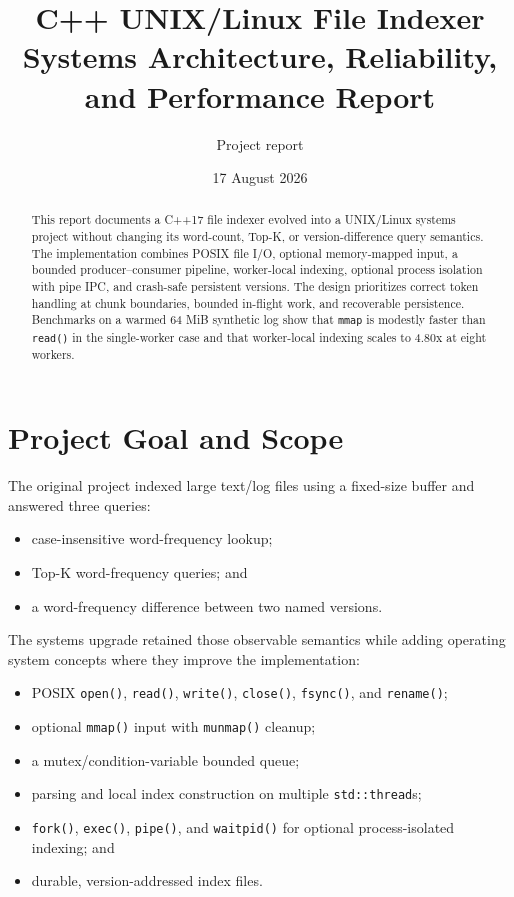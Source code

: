 \documentclass[11pt]{article}
\title{\textbf{C++ UNIX/Linux File Indexer}\\
\large Systems Architecture, Reliability, and Performance Report}
\author{Project report}
\date{17 August 2026}
\begin{document}
\flushbottom
\maketitle

\begin{abstract}
This report documents a C++17 file indexer evolved into a UNIX/Linux systems
project without changing its word-count, Top-K, or version-difference query
semantics. The implementation combines POSIX file I/O, optional memory-mapped
input, a bounded producer--consumer pipeline, worker-local indexing, optional
process isolation with pipe IPC, and crash-safe persistent versions. The design
prioritizes correct token handling at chunk boundaries, bounded in-flight work,
and recoverable persistence. Benchmarks on a warmed 64 MiB synthetic log show
that \texttt{mmap} is modestly faster than \texttt{read()} in the single-worker
case and that worker-local indexing scales to 4.80x at eight workers.
\end{abstract}

\tableofcontents

\section{Project Goal and Scope}

The original project indexed large text/log files using a fixed-size buffer and
answered three queries:

\begin{itemize}[noitemsep]
  \item case-insensitive word-frequency lookup;
  \item Top-K word-frequency queries; and
  \item a word-frequency difference between two named versions.
\end{itemize}

The systems upgrade retained those observable semantics while adding operating
system concepts where they improve the implementation:

\begin{itemize}[noitemsep]
  \item POSIX \texttt{open()}, \texttt{read()}, \texttt{write()}, \texttt{close()},
        \texttt{fsync()}, and \texttt{rename()};
  \item optional \texttt{mmap()} input with \texttt{munmap()} cleanup;
  \item a mutex/condition-variable bounded queue;
  \item parsing and local index construction on multiple \texttt{std::thread}s;
  \item \texttt{fork()}, \texttt{exec()}, \texttt{pipe()}, and \texttt{waitpid()}
        for optional process-isolated indexing; and
  \item durable, version-addressed index files.
\end{itemize}
\end{document}
